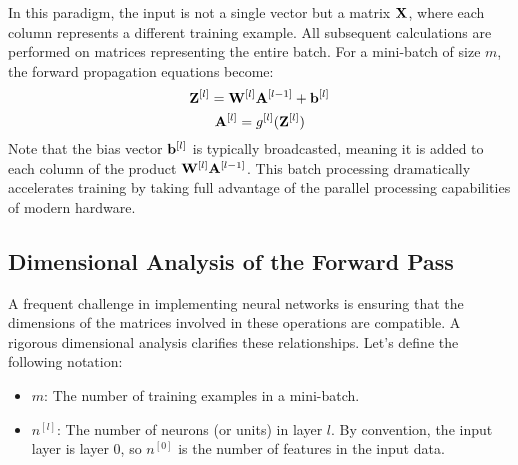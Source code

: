 In this paradigm, the input is not a single vector but a matrix $\mathbf{X}$, where each column represents a different training example. All subsequent calculations are performed on matrices representing the entire batch. For a mini-batch of size $m$, the forward propagation equations become:
\begin{equation}
    \mathbf{Z}^{[l]} = \mathbf{W}^{[l]}\mathbf{A}^{[l-1]} + \mathbf{b}^{[l]}
\end{equation}
\begin{equation}
    \mathbf{A}^{[l]} = g^{[l]}(\mathbf{Z}^{[l]})
\end{equation}
Note that the bias vector $\mathbf{b}^{[l]}$ is typically broadcasted, meaning it is added to each column of the product $\mathbf{W}^{[l]}\mathbf{A}^{[l-1]}$. This batch processing dramatically accelerates training by taking full advantage of the parallel processing capabilities of modern hardware.

\subsection{Dimensional Analysis of the Forward Pass}
A frequent challenge in implementing neural networks is ensuring that the dimensions of the matrices involved in these operations are compatible. A rigorous dimensional analysis clarifies these relationships. Let's define the following notation:
\begin{itemize}
    \item $m$: The number of training examples in a mini-batch.
    \item $n^{[l]}$: The number of neurons (or units) in layer $l$. By convention, the input layer is layer 0, so $n^{[0]}$ is the number of features in the input data.
\end{itemize}

